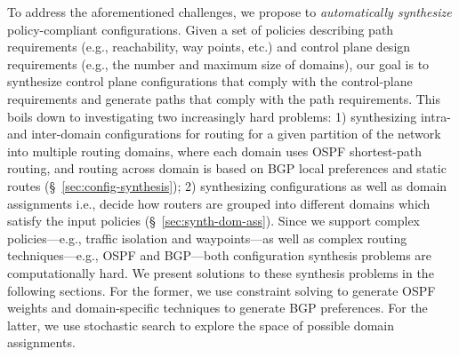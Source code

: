  To address the aforementioned
challenges, we propose to \emph{automatically synthesize}
policy-compliant configurations.  Given a set of policies describing
path requirements (e.g., reachability, way points, etc.)  and control
plane design requirements (e.g., the number and maximum size of
domains), our goal is to synthesize control plane configurations that
comply with the control-plane requirements and generate paths that
comply with the path requirements. This boils down to investigating two increasingly
hard problems: 1) synthesizing intra- and inter-domain configurations
for routing for a given partition of the network into multiple routing
domains, where each domain uses OSPF shortest-path routing, and
routing across domain is based on BGP local preferences and static
routes (\S~\ref{sec:config-synthesis}); 2) synthesizing configurations
as well as domain assignments i.e., decide how routers are grouped
into different domains which satisfy the input policies
(\S~\ref{sec:synth-dom-ass}).  Since we support complex
policies---e.g., traffic isolation and waypoints---as well as complex
routing techniques---e.g., OSPF and BGP---both configuration synthesis
problems are computationally hard.  We present solutions to these
synthesis problems in the following sections. For the former, we use
constraint solving to generate OSPF weights and domain-specific
techniques to generate BGP preferences. For the latter, we use stochastic
search to explore the space of possible domain assignments.
